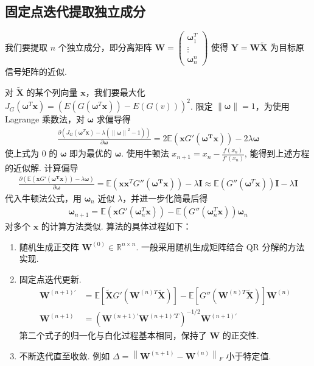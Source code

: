 \documentclass{article}
\newcommand{\bs}[1]{\boldsymbol{#1}}
\newcommand{\RR}{\mathbb{R}}
\newcommand{\EE}{\mathbb{E}}
\newcommand{\np}{\indent\par}
\begin{document}
\subsection{固定点迭代提取独立成分}

我们要提取 $n$ 个独立成分，即分离矩阵 $\bs{W} = \begin{pmatrix}
    \bs{\omega}_1^T \\ \vdots \\ \bs{\omega}_n^n
\end{pmatrix}$
使得 $\bs{Y} = \bs{W}\tilde{\bs{X}}$ 为目标原信号矩阵的近似. \np
对 $\tilde{\bs{X}}$ 的某个列向量 $\bs{x}$，我们要最大化 $J_G(\bs{\omega}^T\bs{x}) = \left(E(G(\bs{\omega}^T\bs{x})) - E(G(v))\right)^2$. 限定 $\left\lVert \bs{\omega}\right\rVert = 1$，为使用 Lagrange 乘数法，对 $\bs{\omega}$ 求偏导得
\begin{align*}
    \frac{\partial \left(J_G(\bs{\omega}^T\bs{x}) - \lambda\left(\left\lVert \bs{\omega}\right\rVert^2 - 1 \right)\right)}{\partial \bs{\omega}} = 2 \EE \left(\bs{x}G'(\bs{\omega^T \bs{x}})\right) - 2 \lambda \bs{\omega}
\end{align*}
使上式为 $0$ 的 $\bs{\omega}$ 即为最优的 $\bs{\omega}$. 使用牛顿法 $x_{n + 1} = x_n - \frac{f(x_n)}{f'(x_n)}$, 能得到上述方程的近似解. 计算偏导
\begin{align*}
    \frac{\partial \left(\EE \left(\bs{x}G'(\bs{\omega^T \bs{x}})\right) - \lambda \bs{\omega}\right)}{\partial \bs{\omega}} = \EE \left(\bs{x}\bs{x}^TG''\left(\bs{\omega^T}\bs{x}\right)\right) - \lambda \bs{I} \approx \EE \left(G''\left(\bs{\omega}^T\bs{x}\right)\right)\bs{I} - \lambda \bs{I}
\end{align*}
代入牛顿法公式，用 $\bs{\omega}_n$ 近似 $\lambda$，并进一步化简最后得
\begin{align*}
    \bs{\omega}_{n + 1} = \EE \left(\bs{x}G'\left(\bs{\omega}_n^T\bs{x}\right)\right) - \EE \left(G''(\bs{\omega}_n^T\bs{x})\right)\bs{\omega}_n
\end{align*}
对多个 $\bs{x}$ 的计算方法类似. 算法的具体过程如下：

\begin{enumerate}
    \item 随机生成正交阵 $\bs{W}^{(0)} \in \RR^{n \times n}$. 一般采用随机生成矩阵结合 QR 分解的方法实现.
    \item 固定点迭代更新. 
    \begin{align*}
        \bs{W}^{(n + 1)'} &= \EE \left[\tilde{\bs{X}}G'\left(\bs{W}^{(n)T}\tilde{\bs{X}}\right)\right] - \EE\left[G''\left(\bs{W}^{(n)T}\tilde{\bs{X}}\right)\right]\bs{W}^{(n)} \\
        \bs{W}^{(n + 1)} &= \left(\bs{W}^{(n + 1)'} \bs{W}^{(n + 1)'T}\right)^{-1/2}\bs{W}^{(n + 1)'}
    \end{align*}
    第二个式子的归一化与白化过程基本相同，保持了 $\bs{W}$ 的正交性.
    \item 不断迭代直至收敛. 例如 $\Delta = \left\lVert \bs{W}^{(n + 1)} - \bs{W}^{(n)}\right\rVert_F$ 小于特定值.
\end{enumerate}
\end{document}
